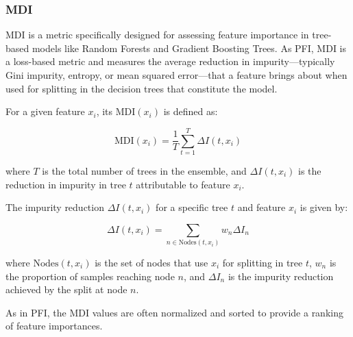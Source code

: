 \subsubsection{MDI}

MDI is a metric specifically designed for assessing feature importance in tree-based models like Random Forests and Gradient Boosting Trees. As PFI, MDI is a loss-based metric and measures the average reduction in impurity—typically Gini impurity, entropy, or mean squared error—that a feature brings about when used for splitting in the decision trees that constitute the model.

For a given feature \( x_i \), its \( \text{MDI}(x_i) \) is defined as:

\begin{equation}
\text{MDI}(x_i) = \frac{1}{T} \sum_{t=1}^{T} \Delta I(t, x_i)
\end{equation}

where \( T \) is the total number of trees in the ensemble, and \( \Delta I(t, x_i) \) is the reduction in impurity in tree \( t \) attributable to feature \( x_i \).

The impurity reduction \( \Delta I(t, x_i) \) for a specific tree \( t \) and feature \( x_i \) is given by:

\begin{equation}
\Delta I(t, x_i) = \sum_{n \in \text{Nodes}(t, x_i)} w_n \Delta I_n
\end{equation}

where \( \text{Nodes}(t, x_i) \) is the set of nodes that use \( x_i \) for splitting in tree \( t \), \( w_n \) is the proportion of samples reaching node \( n \), and \( \Delta I_n \) is the impurity reduction achieved by the split at node \( n \).

As in PFI, the MDI values are often normalized and sorted to provide a ranking of feature importances.

